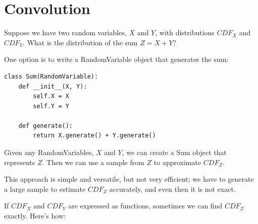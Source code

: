 \documentclass[12pt]{book}
\begin{document}
\section{Convolution}

Suppose we have two random variables, $X$ and $Y$, 
with distributions $CDF_X$ and $CDF_Y$.  What is the
distribution of the sum $Z = X + Y$?


One option is to write a RandomVariable object that generates
the sum:

\begin{verbatim}
class Sum(RandomVariable):
    def __init__(X, Y):
        self.X = X
        self.Y = Y

    def generate():
        return X.generate() + Y.generate()
\end{verbatim}

Given any RandomVariables, $X$ and $Y$, we can create a Sum
object that represents $Z$.  Then we can use a sample from $Z$
to approximate $CDF_Z$.

This approach is simple and versatile, but not very efficient; we
have to generate a large sample to estimate $CDF_Z$ accurately, and
even then it is not exact.

If $CDF_X$ and $CDF_Y$ are expressed as functions, sometimes we can
find $CDF_Z$ exactly.  Here's how:

\newcommand{\infint}{\int_{-\infty}^{\infty}}
\newcommand{\convolution}{\star}
\newcommand{\spa}{~}
\newcommand{\given}{~|~}
\end{document}
